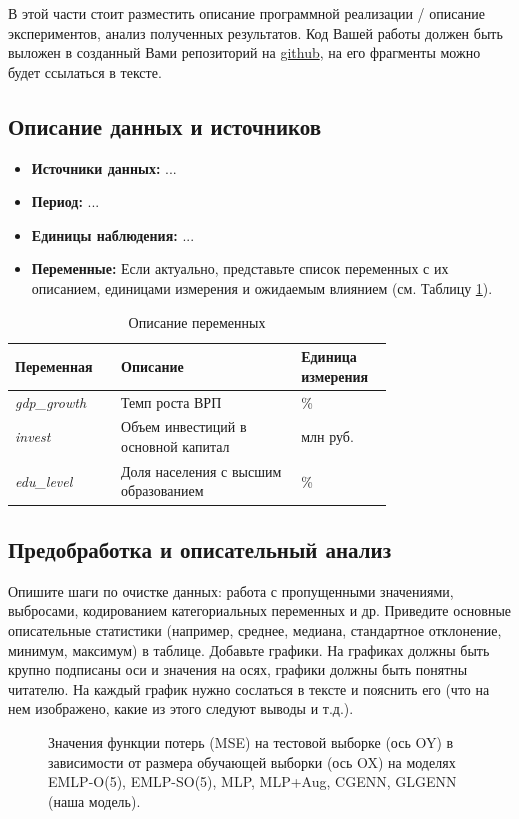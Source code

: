 \documentclass[a4paper,12pt]{article}
\begin{document}
В этой части стоит разместить описание программной реализации / описание экспериментов, анализ полученных результатов. Код Вашей работы должен быть выложен в созданный Вами репозиторий на \href{https://github.com/}{github}, на его фрагменты можно будет ссылаться в тексте.


\subsection{Описание данных и источников}
\begin{itemize}
    \item \textbf{Источники данных:} ...
    \item \textbf{Период:} ...
    \item \textbf{Единицы наблюдения:} ...
    \item \textbf{Переменные:} Если актуально, представьте список переменных с их описанием, единицами измерения и ожидаемым влиянием (см. Таблицу \ref{tab:variables}).
\end{itemize}

\begin{table}[H]
    \centering
    \caption{Описание переменных}
    \label{tab:variables}
    \begin{tabular}{p{0.2\linewidth}p{0.4\linewidth}p{0.15\linewidth}}
        \toprule
        \textbf{Переменная}  & \textbf{Описание}                    & \textbf{Единица измерения} \\
        \midrule
        \textit{gdp\_growth} & Темп роста ВРП                       & \%                         \\
        \textit{invest}      & Объем инвестиций в основной капитал  & млн руб.                   \\
        \textit{edu\_level}  & Доля населения с высшим образованием & \%                         \\
        \bottomrule
    \end{tabular}
\end{table}

\subsection{Предобработка и описательный анализ}
Опишите шаги по очистке данных: работа с пропущенными значениями, выбросами, кодированием категориальных переменных и др. Приведите основные описательные статистики (например, среднее, медиана, стандартное отклонение, минимум, максимум) в таблице. Добавьте графики. На графиках должны быть крупно подписаны оси и значения на осях, графики должны быть понятны читателю. На каждый график нужно сослаться в тексте и пояснить его (что на нем изображено, какие из этого следуют выводы и т.д.).
\begin{figure}[H]
    \centering
    \caption{Значения функции потерь (MSE) на тестовой выборке (ось OY) в зависимости от размера обучающей выборки (ось OX) на моделях EMLP-O(5), EMLP-SO(5), MLP, MLP+Aug, CGENN, GLGENN (наша модель).}
    \label{fig:dist}
\end{figure}
\end{document}
